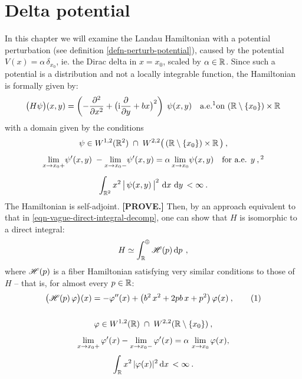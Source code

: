 \chapter{Delta potential}
In this chapter we will examine the Landau Hamiltonian with a potential perturbation (see definition \ref{defn-perturb-potential}), caused by the potential $V(x) = \alpha\,\delta_{x_0}$, ie. the Dirac delta in $x=x_0$, scaled by $\alpha \in \mathbb{R}$. Since such a potential is a distribution and not a locally integrable function, the Hamiltonian is formally given by:
\begin{equation*}
    \big( H\psi \big)(x, y) = \left( -\pd{^2}{x^2} + \big( \i\pd{}{y} + bx \big)^2 \right) \; \psi(x,y)
    \quad \text{a.e.\footnotemark on } (\R \setminus \{ x_0 \}) \times \R
\end{equation*}
with a domain given by the conditions
\begin{gather*}
    \psi \in W^{1,2}(\R^2) \; \cap \; W^{2,2}\big( \,(\R \setminus \{ x_0 \}) \times \R \, \big) \: ,
    \\[5pt]
    \lim_{x \to x_0 +} \!\psi'(x,y)\; - \lim_{x \to x_0 -} \!\psi'(x,y) = \alpha \lim_{x \to x_0} \!\psi(x, y)
    \quad \text{for a.e. } y \: ,\footnotemark
    \\[5pt]
    \int_{\R^2} x^2 \, \big|\, \psi(x,y) \,\big|^2 \, \d{x}\d{y} < \infty \: .
\end{gather*}
The Hamiltonian is self-adjoint. \textbf{[PROVE.]} Then, by an approach equivalent to that in \eqref{eqn-vague-direct-integral-decomp}, one can show that $H$ is isomorphic to a direct integral:
\begin{equation*}
    H \simeq \int^\oplus_{\mathbb{R}} \mathscr{H}(p) \, \mathrm{d}p \, \: ,
\end{equation*}
where $\mathscr{H}(p)$ is a fiber Hamiltonian satisfying very similar conditions to those of~$H$ – that is, for almost every $p \in \mathbb{R}$:
\begin{gather*}
    \big( \Hf(p) \, \varphi \big)(x)
    = -\varphi''(x)
    + \big( b^2 \, x^2 + 2 p b \, x + p^2 \big) \, \varphi(x) \: ,
    \numberthis\label{eqn-dirac-fiber-hamiltonian}
    \\[15pt]
    \varphi \in W^{1,2}(\R) \; \cap \; W^{2,2}( \R \setminus \{ x_0 \}) \: ,
    \\[5pt]
    \lim_{x \to x_0+} \varphi'(x) - \lim_{x \to x_0-} \varphi'(x) = \alpha \, \lim_{x \to x_0} \varphi(x),
    \\[3pt]
    \int_\R x^2 \, |\varphi(x)|^2 \d{x} < \infty \: .
\end{gather*}
